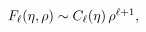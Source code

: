 $\mathop{F_{\ell}\/}\nolimits\!\left(\eta,\rho\right)\sim\mathop{C_{\ell}\/}%
\nolimits\!\left(\eta\right)\rho^{\ell+1},$
